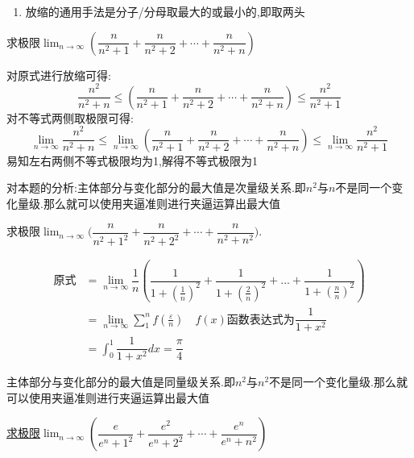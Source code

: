 \documentclass[8pt a4paper, oneside, UTF8]{ctexbook}
\begin{document}
\begin{sloppypar}
\begin{enumerate}
\begin{itemize}
              \end{itemize}
        \item 放缩的通用手法是分子/分母取最大的或最小的,即取两头
    \end{enumerate}
    \begin{problem}
    求极限$\lim_{n\to\infty}\left(\dfrac n{n^2+1}+\dfrac n{n^2+2}+\cdots+\dfrac n{n^2+n}\right)$
    \end{problem}
    \begin{solution}
        对原式进行放缩可得:
        $$
            \dfrac{n^2}{n^2+n} \leqslant \left(\dfrac n{n^2+1}+\dfrac n{n^2+2}+\cdots+\dfrac n{n^2+n}\right) \leqslant \dfrac{n^2}{n^2+1}
        $$
        对不等式两侧取极限可得:
        $$
            \lim_{n \to \infty} \dfrac{n^2}{n^2+n} \leqslant \lim_{n \to \infty} \left(\dfrac n{n^2+1}+\dfrac n{n^2+2}+\cdots+\dfrac n{n^2+n}\right) \leqslant \lim_{n \to \infty} \dfrac{n^2}{n^2+1}
        $$
        易知左右两侧不等式极限均为1,解得不等式极限为1
    \end{solution}
    \begin{note}
        对本题的分析:主体部分与变化部分的最大值是次量级关系.即$n^2$与$n$不是同一个变化量级.那么就可以使用夹逼准则进行夹逼运算出最大值
    \end{note}
    \begin{problem}
    求极限$\lim_{n\to\infty}\Big(\dfrac n{n^2+1^2}+\dfrac n{n^2+2^2}+\cdots+\dfrac n{n^2+n^2}\Big).$
    \end{problem}
    \begin{solution}
        \begin{align*}
            \text{原式} & = \lim_{n \to \infty}\dfrac{1}{n}(\dfrac{1}{1+(\frac{1}{n})^2}+\dfrac{1}{1+(\frac{2}{n})^2}+...+\dfrac{1}{1+(\frac{n}{n})^2}) \\
                      & = \lim_{n \to \infty} \sum_{1}^{n}f(\frac{\varepsilon}{n}) \quad f(x)\text{函数表达式为}\dfrac{1}{1+x^2}                            \\
                      & = \int_0 ^1 \dfrac{1}{1+x^2} dx =\dfrac{\pi}{4}
        \end{align*}
    \end{solution}
    \begin{note}
        主体部分与变化部分的最大值是同量级关系.即$n^2$与$n^2$不是同一个变化量级.那么就可以使用夹逼准则进行夹逼运算出最大值
    \end{note}
    \begin{problem}
    \uline{求极限}$\lim_{n\to\infty}\left(\dfrac{e}{e^{n}+1^{2}}+\dfrac{e^{2}}{e^{n}+2^{2}}+\cdots+\dfrac{e^{n}}{e^{n}+n^{2}}\right)$

\end{problem}
\end{sloppypar}
\end{document}
